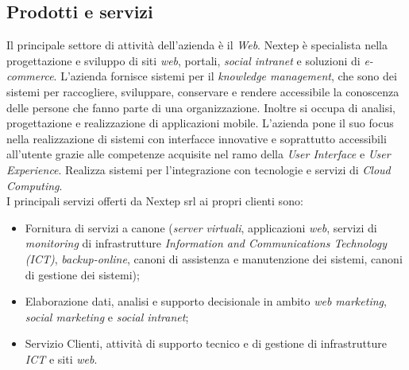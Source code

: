 \subsection{Prodotti e servizi}
Il principale settore di attività dell'azienda è il \emph{Web}. Nextep è specialista nella progettazione e sviluppo di siti \emph{web}, portali, \emph{social intranet} e soluzioni di \emph{e-commerce}. L'azienda fornisce sistemi per il \emph{knowledge management}, che sono dei sistemi per raccogliere, sviluppare, conservare e rendere accessibile la conoscenza delle persone che fanno parte di una organizzazione. Inoltre si occupa di analisi, progettazione e realizzazione di applicazioni mobile. L'azienda pone il suo focus nella realizzazione di sistemi con interfacce innovative e soprattutto accessibili all'utente grazie alle competenze acquisite nel ramo della \emph{User Interface} e \emph{User Experience}. Realizza sistemi per l'integrazione con tecnologie e servizi di \emph{Cloud Computing}.\\
I principali servizi offerti da Nextep srl ai propri clienti sono:
\begin{itemize}
\item Fornitura di servizi a canone (\emph{server virtuali}, applicazioni \emph{web}, servizi di \emph{monitoring} di infrastrutture \emph{Information and Communications Technology (ICT)}, \emph{backup-online}, canoni di assistenza e manutenzione dei sistemi, canoni di gestione dei sistemi);
\item Elaborazione dati, analisi e supporto decisionale in ambito \emph{web marketing}, \emph{social marketing} e \emph{social intranet};
\item Servizio Clienti, attività di supporto tecnico e di gestione di infrastrutture \emph{ICT} e siti \emph{web}.
\end{itemize}

